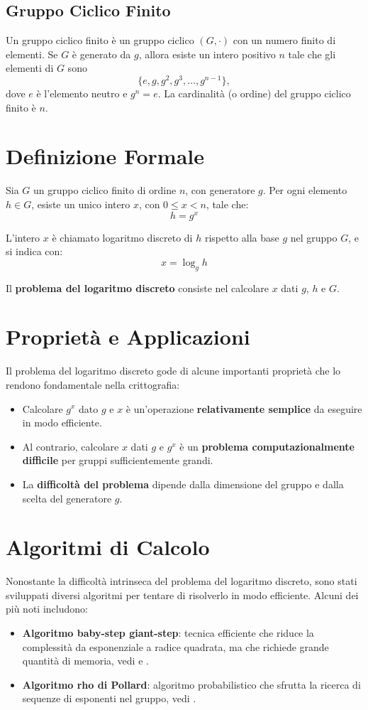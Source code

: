 \documentclass[a4paper,12pt]{report}
\begin{document}
\subsection*{Gruppo Ciclico Finito}

Un gruppo ciclico finito è un gruppo ciclico \( (G, \cdot) \) con un numero finito di elementi. Se \( G \) è generato da \( g \), allora esiste un intero positivo \( n \) tale che gli elementi di \( G \) sono
\[\{e, g, g^2, g^3, \ldots, g^{n-1}\},\]
dove \( e \) è l'elemento neutro e \( g^n = e \). La cardinalità (o ordine) del gruppo ciclico finito è \( n \).

\section{Definizione Formale}
Sia $G$ un gruppo ciclico finito di ordine $n$, con generatore $g$. Per ogni elemento $h \in G$, esiste un unico intero $x$, con $0 \leq x < n$, tale che:
\[h = g^x\]

L'intero $x$ è chiamato logaritmo discreto di $h$ rispetto alla base $g$ nel gruppo $G$, e si indica con:
\[x = \log_g h\]

Il \textbf{problema del logaritmo discreto} consiste nel calcolare $x$ dati $g$, $h$ e $G$. 

\section{Proprietà e Applicazioni}
Il problema del logaritmo discreto gode di alcune importanti proprietà che lo rendono fondamentale nella crittografia:

\begin{itemize}
    \item Calcolare $g^x$ dato $g$ e $x$ è un'operazione \textbf{relativamente semplice }da eseguire in modo efficiente.
    \item Al contrario, calcolare $x$ dati $g$ e $g^x$ è un \textbf{problema computazionalmente difficile} per gruppi sufficientemente grandi.
    \item La \textbf{difficoltà del problema} dipende dalla dimensione del gruppo e dalla scelta del generatore $g$.
\end{itemize}

\section{Algoritmi di Calcolo}
Nonostante la difficoltà intrinseca del problema del logaritmo discreto, sono stati sviluppati diversi algoritmi per tentare di risolverlo in modo efficiente. Alcuni dei più noti includono:
\begin{itemize}
    \item \textbf{Algoritmo baby-step giant-step}: tecnica efficiente che riduce la complessità da esponenziale a radice quadrata, ma che richiede grande quantità di memoria, vedi \cite{silverman2009elliptic} e \cite{coron2011baby}.
    \item \textbf{Algoritmo rho di Pollard}: algoritmo probabilistico che sfrutta la ricerca di sequenze di esponenti nel gruppo, vedi \cite{nickerson2020collision}.
\end{itemize}
\end{document}
